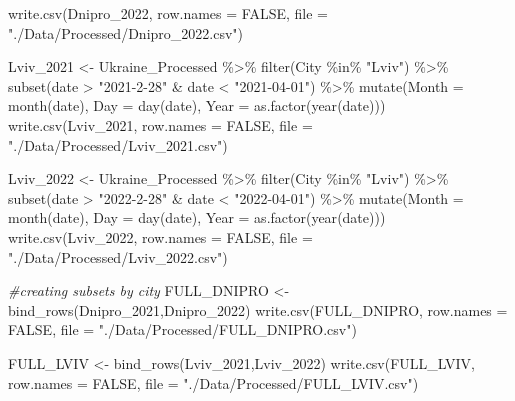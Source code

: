 \documentclass[
  12pt,
]{article}
\newenvironment{Shaded}{\begin{snugshade}}{\end{snugshade}}
\newcommand{\AttributeTok}[1]{\textcolor[rgb]{0.77,0.63,0.00}{#1}}
\newcommand{\CommentTok}[1]{\textcolor[rgb]{0.56,0.35,0.01}{\textit{#1}}}
\newcommand{\ConstantTok}[1]{\textcolor[rgb]{0.00,0.00,0.00}{#1}}
\newcommand{\FunctionTok}[1]{\textcolor[rgb]{0.00,0.00,0.00}{#1}}
\newcommand{\NormalTok}[1]{#1}
\newcommand{\OtherTok}[1]{\textcolor[rgb]{0.56,0.35,0.01}{#1}}
\newcommand{\SpecialCharTok}[1]{\textcolor[rgb]{0.00,0.00,0.00}{#1}}
\newcommand{\StringTok}[1]{\textcolor[rgb]{0.31,0.60,0.02}{#1}}
\begin{document}
\begin{Shaded}
\begin{Highlighting}[]
\FunctionTok{write.csv}\NormalTok{(Dnipro\_2022, }\AttributeTok{row.names =} \ConstantTok{FALSE}\NormalTok{, }\AttributeTok{file =} \StringTok{"./Data/Processed/Dnipro\_2022.csv"}\NormalTok{)}

\NormalTok{Lviv\_2021 }\OtherTok{\textless{}{-}}\NormalTok{ Ukraine\_Processed }\SpecialCharTok{\%\textgreater{}\%} 
  \FunctionTok{filter}\NormalTok{(City }\SpecialCharTok{\%in\%} \StringTok{"Lviv"}\NormalTok{) }\SpecialCharTok{\%\textgreater{}\%}
  \FunctionTok{subset}\NormalTok{(date }\SpecialCharTok{\textgreater{}} \StringTok{"2021{-}2{-}28"} \SpecialCharTok{\&}\NormalTok{ date }\SpecialCharTok{\textless{}} \StringTok{"2021{-}04{-}01"}\NormalTok{) }\SpecialCharTok{\%\textgreater{}\%}
  \FunctionTok{mutate}\NormalTok{(}\AttributeTok{Month =} \FunctionTok{month}\NormalTok{(date), }
         \AttributeTok{Day =} \FunctionTok{day}\NormalTok{(date), }
          \AttributeTok{Year =} \FunctionTok{as.factor}\NormalTok{(}\FunctionTok{year}\NormalTok{(date)))}
\FunctionTok{write.csv}\NormalTok{(Lviv\_2021, }\AttributeTok{row.names =} \ConstantTok{FALSE}\NormalTok{, }\AttributeTok{file =} \StringTok{"./Data/Processed/Lviv\_2021.csv"}\NormalTok{)}

\NormalTok{Lviv\_2022 }\OtherTok{\textless{}{-}}\NormalTok{ Ukraine\_Processed }\SpecialCharTok{\%\textgreater{}\%} 
  \FunctionTok{filter}\NormalTok{(City }\SpecialCharTok{\%in\%} \StringTok{"Lviv"}\NormalTok{) }\SpecialCharTok{\%\textgreater{}\%}
  \FunctionTok{subset}\NormalTok{(date }\SpecialCharTok{\textgreater{}} \StringTok{"2022{-}2{-}28"} \SpecialCharTok{\&}\NormalTok{ date }\SpecialCharTok{\textless{}} \StringTok{"2022{-}04{-}01"}\NormalTok{) }\SpecialCharTok{\%\textgreater{}\%}
  \FunctionTok{mutate}\NormalTok{(}\AttributeTok{Month =} \FunctionTok{month}\NormalTok{(date), }
         \AttributeTok{Day =} \FunctionTok{day}\NormalTok{(date), }
          \AttributeTok{Year =} \FunctionTok{as.factor}\NormalTok{(}\FunctionTok{year}\NormalTok{(date)))}
\FunctionTok{write.csv}\NormalTok{(Lviv\_2022, }\AttributeTok{row.names =} \ConstantTok{FALSE}\NormalTok{, }\AttributeTok{file =} \StringTok{"./Data/Processed/Lviv\_2022.csv"}\NormalTok{)}

\CommentTok{\#creating subsets by city}
\NormalTok{FULL\_DNIPRO }\OtherTok{\textless{}{-}} \FunctionTok{bind\_rows}\NormalTok{(Dnipro\_2021,Dnipro\_2022)}
\FunctionTok{write.csv}\NormalTok{(FULL\_DNIPRO, }\AttributeTok{row.names =} \ConstantTok{FALSE}\NormalTok{, }\AttributeTok{file =} \StringTok{"./Data/Processed/FULL\_DNIPRO.csv"}\NormalTok{)}

\NormalTok{FULL\_LVIV }\OtherTok{\textless{}{-}} \FunctionTok{bind\_rows}\NormalTok{(Lviv\_2021,Lviv\_2022)}
\FunctionTok{write.csv}\NormalTok{(FULL\_LVIV, }\AttributeTok{row.names =} \ConstantTok{FALSE}\NormalTok{, }\AttributeTok{file =} \StringTok{"./Data/Processed/FULL\_LVIV.csv"}\NormalTok{)}
\end{Highlighting}
\end{Shaded}
\end{document}
